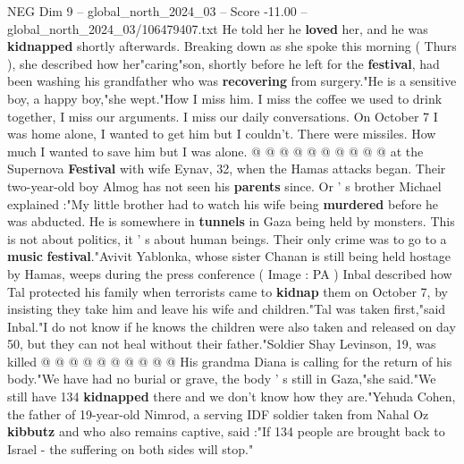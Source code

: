\begin{textsample}{NEG Dim 9 – global\_north\_2024\_03 – Score -11.00 – global\_north\_2024\_03/106479407.txt}
He told her he \textbf{loved} her, and he was \textbf{kidnapped} shortly afterwards.
Breaking down as she spoke this morning ( Thurs ), she described how her"caring"son, shortly before he left for the \textbf{festival}, had been washing his grandfather who was \textbf{recovering} from surgery."He is a sensitive boy, a happy boy,"she wept."How I miss him.
I miss the coffee we used to drink together, I miss our arguments.
I miss our daily conversations.
On October 7 I was home alone, I wanted to get him but I couldn't.
There were missiles.
How much I wanted to save him but I was alone. @ @ @ @ @ @ @ @ @ @ at the Supernova \textbf{Festival} with wife Eynav, 32, when the Hamas attacks began.
Their two-year-old boy Almog has not seen his \textbf{parents} since.
Or ' s brother Michael explained :"My little brother had to watch his wife being \textbf{murdered} before he was abducted.
He is somewhere in \textbf{tunnels} in Gaza being held by monsters.
This is not about politics, it ' s about human beings.
Their only crime was to go to a \textbf{music} \textbf{festival}."Avivit Yablonka, whose sister Chanan is still being held hostage by Hamas, weeps during the press conference ( Image : PA ) Inbal described how Tal protected his family when terrorists came to \textbf{kidnap} them on October 7, by insisting they take him and leave his wife and children."Tal was taken first,"said Inbal."I do not know if he knows the children were also taken and released on day 50, but they can not heal without their father."Soldier Shay Levinson, 19, was killed @ @ @ @ @ @ @ @ @ @ His grandma Diana is calling for the return of his body."We have had no burial or grave, the body ' s still in Gaza,"she said."We still have 134 \textbf{kidnapped} there and we don't know how they are."Yehuda Cohen, the father of 19-year-old Nimrod, a serving IDF soldier taken from Nahal Oz \textbf{kibbutz} and who also remains captive, said :"If 134 people are brought back to Israel - the suffering on both sides will stop."

\end{textsample}
